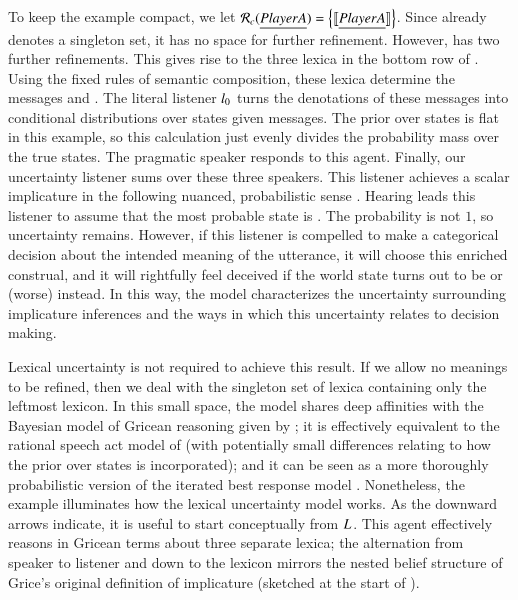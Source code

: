 \documentclass[leqno,12pt]{article}
\begin{document}
To keep the example compact, we let
$\mathcal{R}_{c}(\emph{Player A}) = \left\{ \llbracket\emph{Player A}\rrbracket \right\}$. Since
 already denotes a singleton set, it has no space for
further refinement. However,  has two further
refinements. This gives rise to the three lexica in the bottom row of
.  Using the fixed rules of semantic
composition, these lexica determine the messages  and . The literal listener
$l_{0}$ turns the denotations of these messages into
conditional distributions over states given messages. The prior over
states is flat in this example, so this calculation just evenly
divides the probability mass over the true states. The pragmatic
speaker responds to this agent. Finally, our uncertainty listener sums
over these three speakers. This listener achieves a scalar implicature
in the following nuanced, probabilistic sense
. Hearing  leads this
listener to assume that the most probable state is . The
probability is not $1$, so uncertainty remains. However, if this
listener is compelled to make a categorical decision about the
intended meaning of the utterance, it will choose this enriched
construal, and it will rightfully feel deceived if the world state
turns out to be  or (worse)  instead. In this way,
the model characterizes the uncertainty surrounding implicature
inferences \citep{Hirschberg85} and the ways in which this uncertainty
relates to decision making.

Lexical uncertainty is not required to achieve this result. If we
allow no meanings to be refined, then we deal with the singleton set
of lexica containing only the leftmost lexicon. In this small space,
the model shares deep affinities with the Bayesian model of Gricean reasoning
given by \citet{Russell:2012}; it is effectively equivalent to the
rational speech act model of \citet{Frank:Goodman:2012} (with
potentially small differences relating to how the prior over states is
incorporated); and it can be seen as a more thoroughly probabilistic
version of the iterated best response model
\citep{Franke09DISS,Jaeger:2007,Jaeger:2011}. Nonetheless, the example
illuminates how the lexical uncertainty model works. As the downward
arrows indicate, it is useful to start conceptually from
$L_{}$. This agent effectively reasons in Gricean
terms about three separate lexica; the alternation from speaker to
listener and down to the lexicon mirrors the nested belief structure
of Grice's original definition of implicature (sketched at the start
of ).
\end{document}
